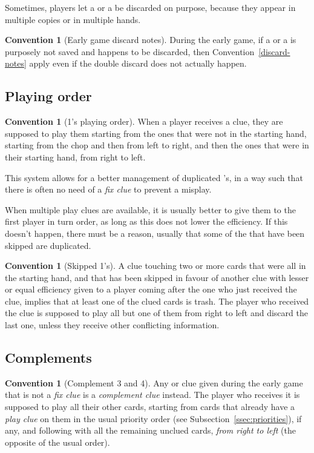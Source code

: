\documentclass[a4paper]{article}
\theoremstyle{plain}
\theoremstyle{definition}
\newtheorem{convention}[theorem]{Convention}
\begin{document}
Sometimes, players let a  or a  be discarded on purpose, because they appear in multiple copies or in multiple hands.

\begin{convention}[Early game discard notes]
	During the early game, if a  or a  is purposely not saved and happens to be discarded, then Convention~\ref{discard-notes} apply even if the double discard does not actually happen.
\end{convention}

\subsection{Playing order}

\begin{convention}[1's playing order]
	When a player receives a  clue, they are supposed to play them starting from the ones that were not in the starting hand, starting from the chop and then from left to right, and then the ones that were in their starting hand, from right to left.
\end{convention}

This system allows for a better management of duplicated 's, in a way such that there is often no need of a \emph{fix clue} to prevent a misplay.

When multiple play clues are available, it is usually better to give them to the first player in turn order, as long as this does not lower the efficiency. If this doesn't happen, there must be a reason, usually that some of the  that have been skipped are duplicated.

\begin{convention}[Skipped 1's]
	A  clue touching two or more cards that were all in the starting hand, and that has been skipped in favour of another clue with lesser or equal efficiency given to a player coming after the one who just received the clue, implies that at least one of the clued cards is trash. The player who received the clue is supposed to play all but one of them from right to left and discard the last one, unless they receive other conflicting information.
\end{convention}

\subsection{Complements}

\begin{convention}[Complement 3 and 4]
	Any  or  clue given during the early game that is not a \emph{fix clue} is a \emph{complement clue} instead. The player who receives it is supposed to play all their other cards, starting from cards that already have a \emph{play clue} on them in the usual priority order (see Subsection~\ref{ssec:priorities}), if any, and following with all the remaining unclued cards, \emph{from right to left} (the opposite of the usual order).
\end{convention}
\end{document}
